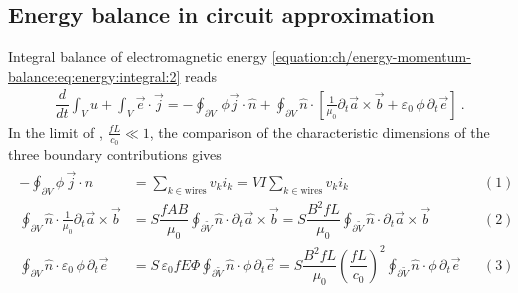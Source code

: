 \documentclass[letterpaper,10pt,english]{jupyterBook}
\begin{document}
\sphinxAtStartPar
{}

\sphinxAtStartPar
{}

\sphinxstepscope


\subsection{Energy balance in circuit approximation}
\label{\detokenize{ch/circuits-electric-energy:energy-balance-in-circuit-approximation}}\label{\detokenize{ch/circuits-electric-energy:classical-electromagnetism-circuits-electric-energy}}\label{\detokenize{ch/circuits-electric-energy::doc}}
\sphinxAtStartPar
Integral balance of electromagnetic energy \eqref{equation:ch/energy-momentum-balance:eq:energy:integral:2} reads
\begin{equation*}
\begin{split}\dfrac{d}{dt} \int_V u + \int_{V} \vec{e} \cdot \vec{j} = - \oint_{\partial V} \, \phi \vec{j} \cdot \hat{n} + \oint_{\partial V} \hat{n} \cdot \left[ \frac{1}{\mu_0} \partial_t \vec{a} \times \vec{b} + \varepsilon_0 \, \phi\, \partial_t \vec{e} \right] \ .\end{split}
\end{equation*}
\sphinxAtStartPar
In the limit of {\hyperref[\detokenize{ch/regimes-slow:classical-electromagnetism-regimes-slow}]{}}, \(\frac{f L}{c_0} \ll 1\), the comparison of the characteristic dimensions of the three boundary contributions gives
\begin{equation*}
\begin{split}\begin{aligned}
  - \oint_{\partial V} \phi \, \vec{j} \cdot \hat{n} & = \sum_{k \in \text{wires}} v_k i_k = V I \sum_{k \in \text{wires}} v_k i_k && (1) \\
  \oint_{\partial V} \hat{n} \cdot \frac{1}{\mu_0} \partial_t \vec{a} \times \vec{b} & = S \dfrac{ f A B }{\mu_0} \oint_{\partial \widetilde{V}} \hat{n} \cdot \partial_t \vec{a} \times \vec{b} = S \dfrac{B^2 f L}{\mu_0}  \oint_{\partial \widetilde{V}} \hat{n} \cdot \partial_t \vec{a} \times \vec{b}  && (2) \\
  \oint_{\partial V} \hat{n} \cdot \varepsilon_0 \, \phi\, \partial_t \vec{e} & = S \, \varepsilon_0 f E \Phi \oint_{\partial \widetilde{V}} \hat{n} \cdot \phi\, \partial_t \vec{e} = S \dfrac{B^2 f L}{\mu_0} \left( \dfrac{f L}{c_0} \right)^2 \oint_{\partial \widetilde{V}} \hat{n} \cdot \phi\, \partial_t \vec{e} && (3) \\
\end{aligned}\end{split}
\end{equation*}
\end{document}
